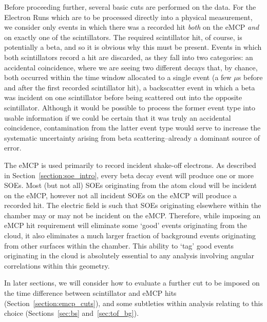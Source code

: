 Before proceeding further, several basic cuts are performed on the data.  For the Electron Runs which are to be processed directly into a physical measurement, we consider only events in which there was a recorded hit \emph{both} on the eMCP \emph{and} on exactly one of the scintillators.  The required scintillator hit, of course, is potentially a beta, and so it is obvious why this must be present.  Events in which both scintillators record a hit are discarded, as they fall into two categories:  an accidental coincidence, where we are seeing two different decays that, by chance, both occurred within the time window allocated to a single event (a few $\mu$s before and after the first recorded scintillator hit), a backscatter event in which a beta was incident on one scintillator before being scattered out into the opposite scintillator.  Although it would be possible to process the former event type into usable information if we could be certain that it was truly an accidental coincidence, contamination from the latter event type would serve to increase the systematic uncertainty arising from beta scattering--already a dominant source of error.


The eMCP is used primarily to record incident shake-off electrons.  As described in Section~\ref{section:soe_intro}, every beta decay event will produce one or more SOEs.  Most (but not all) SOEs originating from the atom cloud will be incident on the eMCP, 
however not all incident SOEs on the eMCP will produce a recorded hit.  The electric field is such that SOEs originating elsewhere within the chamber may or may not be incident on the eMCP.  Therefore, while imposing an eMCP hit requirement will eliminate some `good' events originating from the cloud, it also eliminates a much larger fraction of background events originating from other surfaces within the chamber.  This ability to `tag' good events originating in the cloud is absolutely essential to any analysis involving angular correlations within this geometry.


In later sections, we will consider how to evaluate a further cut to be imposed on the time difference between scintillator and eMCP hits (Section~\ref{section:emcp_cuts}), and some subtleties within analysis relating to this choice (Sections~\ref{sec:bs} and~\ref{sec:tof_bg}).

